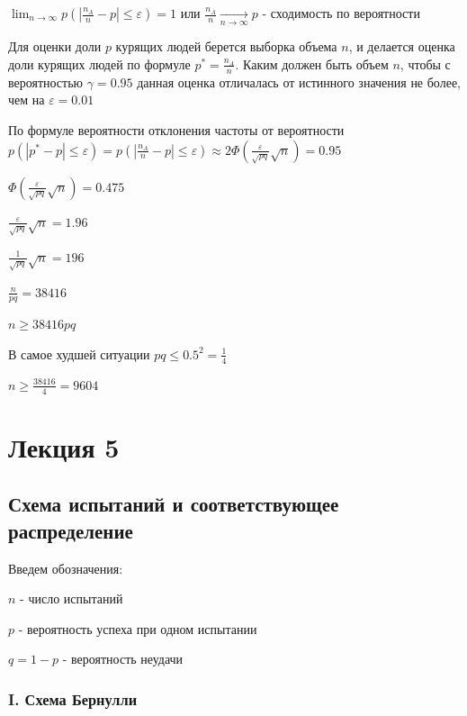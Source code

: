 \documentclass[12pt]{article}
\begin{document}
    $\lim_{n \to \infty} p\left(|\frac{n_A}{n} - p| \leq \varepsilon\right) = 1$ или $\frac{n_A}{n} \underset{n \to \infty}{\longrightarrow} p$ - сходимость по вероятности

    \Ex Для оценки доли $p$ курящих людей берется выборка объема $n$, и делается оценка доли курящих людей по формуле $p^* = \frac{n_A}{n}$.
    Каким должен быть объем $n$, чтобы с вероятностью $\gamma = 0.95$ данная оценка отличалась от истинного значения не более, чем на $\varepsilon = 0.01$

    По формуле вероятности отклонения частоты от вероятности $p(|p^* - p| \leq \varepsilon) = p\left(|\frac{n_A}{n} - p| \leq \varepsilon\right) \approx 2\Phi\left(\frac{\varepsilon}{\sqrt{pq}}\sqrt{n}\right) = 0.95$

    $\Phi\left(\frac{\varepsilon}{\sqrt{pq}}\sqrt{n}\right) = 0.475$

    $\frac{\varepsilon}{\sqrt{pq}}\sqrt{n} = 1.96$

    $\frac{1}{\sqrt{pq}}\sqrt{n} = 196$

    $\frac{n}{pq} = 38416$

    $n \geq 38416 pq$

    В самое худшей ситуации $pq \leq 0.5^2 = \frac{1}{4}$

    $n \geq \frac{38416}{4} = 9604$


    \section{Лекция 5}

    \subsection{Схема испытаний и соответствующее распределение}

    Введем обозначения:

    $n$ - число испытаний

    $p$ - вероятность успеха при одном испытании

    $q = 1 - p$ - вероятность неудачи

    \hypertarget{bernoullischema2}{}

    \subsubsection{I. Схема Бернулли}
\end{document}
